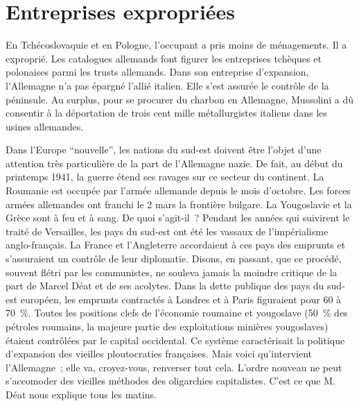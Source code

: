 \documentclass[french,twoside]{book} %
\begin{document}
\section[{Entreprises expropriées}]{Entreprises expropriées}
\noindent En Tchécoslovaquie et en Pologne, l’occupant a pris moins de ménagements. Il a exproprié. Les catalogues allemands font figurer les entreprises tchèques et polonaises parmi les trusts allemands. Dans son entreprise d’expansion, l’Allemagne n’a pas épargné l’allié italien. Elle s’est assurée le contrôle de la péninsule. Au surplus, pour se procurer du charbon en Allemagne, Mussolini a dû consentir à la déportation de trois cent mille métallurgistes italiens dans les usines allemandes.\par
Dans l’Europe “nouvelle”, les nations du sud-est doivent être l’objet d’une attention très particulière de la part de l’Allemagne nazie. De fait, au début du printemps 1941, la guerre étend ses ravages sur ce secteur du continent. La Roumanie est occupée par l’armée allemande depuis le mois d’octobre. Les forces armées allemandes ont franchi le 2 mars la frontière bulgare. La Yougoslavie et la Grèce sont à feu et à sang. De quoi s’agit-il ? Pendant les années qui suivirent le traité de Versailles, les pays du sud-est ont été les vassaux de l’impérialisme anglo-français. La France et l’Angleterre accordaient à ces pays des emprunts et s’assuraient un contrôle de leur diplomatie. Disons, en passant, que ce procédé, souvent flétri par les communistes, ne souleva jamais la moindre critique de la part de Marcel Déat et de ses acolytes. Dans la dette publique des pays du sud-est européen, les emprunts contractés à Londres et à Paris figuraient pour 60 à 70 \%. Toutes les positions clefs de l’économie roumaine et yougoslave (50 \% des pétroles roumains, la majeure partie des exploitations minières yougoslaves) étaient contrôlées par le capital occidental. Ce système caractérisait la politique d’expansion des vieilles ploutocraties françaises. Mais voici qu’intervient l’Allemagne ; elle va, croyez-vous, renverser tout cela. L’ordre nouveau ne peut s’accomoder des vieilles méthodes des oligarchies capitalistes. C’est ce que M. Déat nous explique tous les matins.\par
\end{document}
